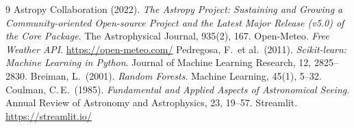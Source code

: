 \documentclass[12pt,a4paper]{article}
\begin{document}
\begin{thebibliography}{9}
 Astropy Collaboration (2022). \emph{The Astropy Project: Sustaining and
  Growing a Community-oriented Open-source Project and the Latest Major Release (v5.0) of the
  Core Package}. The Astrophysical Journal, 935(2), 167.
 Open-Meteo. \emph{Free Weather API}. \url{https://open-meteo.com/}
 Pedregosa, F.\ et al.\ (2011). \emph{Scikit-learn: Machine Learning in
  Python}. Journal of Machine Learning Research, 12, 2825--2830.
 Breiman, L.\ (2001). \emph{Random Forests}. Machine Learning, 45(1), 5--32.
 Coulman, C.\,E.\ (1985). \emph{Fundamental and Applied Aspects of
  Astronomical Seeing}. Annual Review of Astronomy and Astrophysics, 23, 19--57.
 Streamlit. \url{https://streamlit.io/}
\end{thebibliography}
\end{document}

